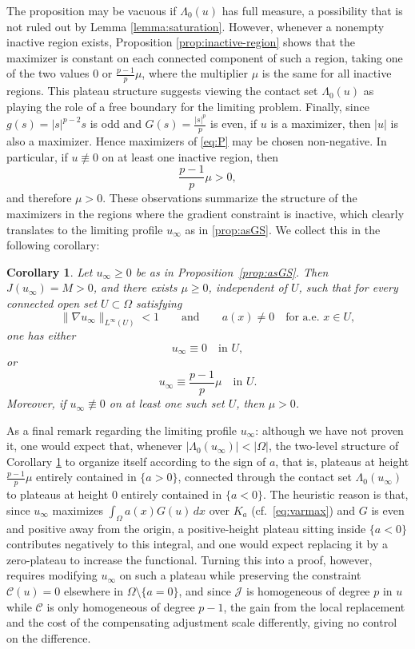 \documentclass[11pt,reqno]{amsart}
\theoremstyle{plain}
\newtheorem{corollary}[theorem]{Corollary}
\theoremstyle{definition}
\numberwithin{equation}{section}
\begin{document}
The proposition may be vacuous if $\Lambda_0 (u)$ has full measure, a
possibility that is not ruled out by Lemma \ref{lemma:saturation}.
However, whenever a nonempty inactive region exists, Proposition
\ref{prop:inactive-region} shows that the maximizer is constant on each
connected component of such a region, taking one of the two values $0$ or $\frac{p-1}{p}\mu$, where the multiplier $\mu$ is the same for all inactive regions. This plateau structure suggests viewing the contact set $\Lambda_0 (u)$ as
playing the role of a free boundary for the limiting problem. Finally, since $g(s)=|s|^{p-2}s$ is odd and $G(s)= \tfrac{|s|^p}{p}$ is even, if $u$
is a maximizer, then $|u|$ is also a maximizer. Hence maximizers of \eqref{eq:P} may be
chosen non-negative. In particular, if $u\not\equiv0$ on at least one
inactive region, then
$$
\frac{p-1}{p}\mu>0,
$$
and therefore $\mu>0$. These observations summarize the structure of the maximizers in the
regions where the gradient constraint is inactive, which clearly translates to the limiting profile $u_\infty$ as in \eqref{prop:asGS}. We collect this in the following corollary:

\begin{corollary}\label{cor:limitprofile-plateaus}
Let $u_\infty\geq 0$ be as in Proposition~\ref{prop:asGS}. Then $J(u_\infty)=M>0$,
and there exists $\mu\geq0$, independent of $U$, such that for every
connected open set $U\subset\Omega$ satisfying
\[
\|\nabla u_\infty\|_{L^\infty(U)}<1
\qquad\text{and}\qquad
a(x)\neq0 \quad\text{for a.e. }x\in U,
\]
one has either
\[
u_\infty\equiv0\quad\text{in }U,
\]
or
\[
u_\infty\equiv\frac{p-1}{p}\mu
\quad\text{in }U.
\]
Moreover, if $u_\infty\not\equiv0$ on at least one such set $U$, then
$\mu>0$.
\end{corollary}

As a final remark regarding the limiting profile $u_\infty$: although we have not proven it, one would expect that, whenever $|\Lambda_0(u_\infty)| < |\Omega|$, the two-level structure of Corollary \ref{cor:limitprofile-plateaus} to organize itself according to the sign of $a$, that is, plateaus at height $\frac{p-1}{p}\mu$ entirely contained in $\{a>0\}$, connected through the contact set $\Lambda_0 (u_\infty)$ to plateaus at height $0$ entirely contained in $\{a<0\}$. The heuristic reason is that, since $u_\infty$ maximizes $\int_\Omega a(x)G(u)\,dx$ over $K_a$ (cf.\ \eqref{eq:varmax}) and $G$ is even and positive away from the origin, a positive-height plateau sitting inside $\{a<0\}$ contributes negatively to this integral, and one would expect replacing it by a zero-plateau to increase the functional. Turning this into a proof, however, requires modifying $u_\infty$ on such a plateau while preserving the constraint $\mathcal C(u)=0$ elsewhere in $\Omega \setminus \{a=0\}$, and since $\mathcal{J}$ is homogeneous of degree $p$ in $u$ while $\mathcal{C}$ is only homogeneous of degree $p-1$, the gain from the local replacement and the cost of the compensating adjustment scale differently, giving no control on the difference. 
\end{document}
